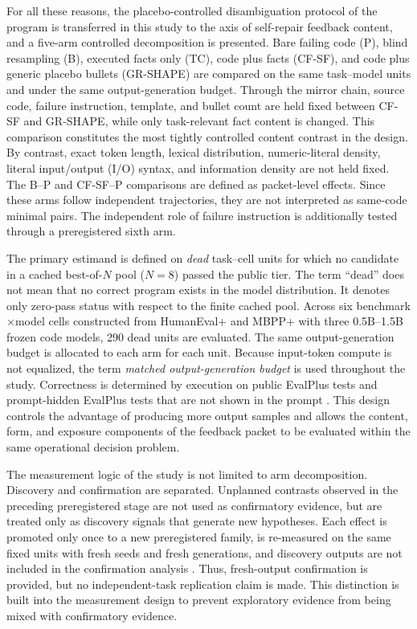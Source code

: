 \documentclass{article}
\numberwithin{equation}{section}  %
\theoremstyle{definition}
\newcommand{\armP}{\textsf{P}}
\newcommand{\armB}{\textsf{B}}
\newcommand{\armTC}{\textsf{TC}}
\newcommand{\armCF}{\textsf{CF-SF}}
\newcommand{\armGR}{\textsf{GR-SHAPE}}
\begin{document}
For all these reasons, the placebo-controlled disambiguation protocol of the program is transferred
in this study to the axis of self-repair feedback content, and a five-arm controlled decomposition is
presented. Bare failing code (\armP), blind resampling (\armB), executed facts only (\armTC), code plus
facts (\armCF), and code plus generic placebo bullets (\armGR) are compared on the same task--model
units and under the same output-generation budget. Through the mirror chain, source code, failure
instruction, template, and bullet count are held fixed between \armCF{} and \armGR{}, while only
task-relevant fact content is changed. This comparison constitutes the most tightly controlled content
contrast in the design. By contrast, exact token length, lexical distribution, numeric-literal density,
literal input/output (I/O) syntax, and information density are not held fixed. The \armB{}--\armP{}
and \armCF{}--\armP{} comparisons are defined as packet-level effects. Since these arms follow
independent trajectories, they are not interpreted as same-code minimal pairs. The independent role of
failure instruction is additionally tested through a preregistered sixth arm.

The primary estimand is defined on \emph{dead} task--cell units for which no candidate in a cached
best-of-$N$ pool ($N=8$) passed the public tier. The term ``dead'' does not mean that no correct program
exists in the model distribution. It denotes only zero-pass status with respect to the finite cached
pool. Across six benchmark$\times$model cells constructed from HumanEval+ and MBPP+ with three
0.5B--1.5B frozen code models, 290 dead units are evaluated. The same output-generation budget is
allocated to each arm for each unit. Because input-token compute is not equalized, the term
\emph{matched output-generation budget} is used throughout the study. Correctness is determined by
execution on public EvalPlus tests and prompt-hidden EvalPlus tests that are not shown in the prompt
\citep{liu2023evalplus}. This design controls the advantage of producing more output samples and
allows the content, form, and exposure components of the feedback packet to be evaluated within the
same operational decision problem.

The measurement logic of the study is not limited to arm decomposition. Discovery and confirmation
are separated. Unplanned contrasts observed in the preceding preregistered stage are not used as
confirmatory evidence, but are treated only as discovery signals that generate new hypotheses. Each
effect is promoted only once to a new preregistered family, is re-measured on the same fixed units
with fresh seeds and fresh generations, and discovery outputs are not included in the confirmation
analysis \citep{popper1959logic,popper1963conjectures,mayospanos2006severe,hofman2023prereg}. Thus,
fresh-output confirmation is provided, but no independent-task replication claim is made. This
distinction is built into the measurement design to prevent exploratory evidence from being mixed
with confirmatory evidence.
\end{document}
